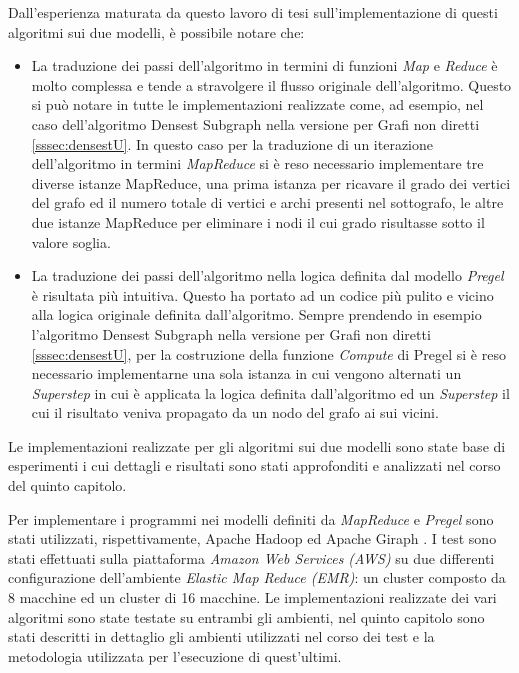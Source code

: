 \documentclass[LaM,binding=0.6cm]{sapthesis}
\begin{document}
Dall'esperienza maturata da questo lavoro di tesi sull'implementazione di questi algoritmi sui due modelli, è possibile notare che:
\begin{itemize}
\item La traduzione dei passi dell'algoritmo in termini di funzioni \textit{Map}  e \textit{Reduce} è molto complessa e tende a stravolgere il flusso originale dell'algoritmo. Questo si può notare in tutte le implementazioni realizzate come, ad esempio, nel caso dell'algoritmo Densest Subgraph nella versione per Grafi non diretti \ref{sssec:densestU}. In questo caso per la traduzione di un iterazione dell'algoritmo in termini \textit{MapReduce} si è reso necessario implementare tre diverse istanze MapReduce, una prima istanza per ricavare il grado dei vertici del grafo ed il numero totale di vertici e archi presenti nel sottografo, le altre due istanze MapReduce per eliminare i nodi il cui grado risultasse sotto il valore soglia. 
\item La traduzione dei passi dell'algoritmo nella logica definita dal modello \textit{Pregel} è risultata più intuitiva. Questo ha portato ad un codice più pulito e vicino alla logica originale definita dall'algoritmo. Sempre prendendo in esempio l'algoritmo Densest Subgraph nella versione per Grafi non diretti \ref{sssec:densestU}, per la costruzione della funzione \textit{Compute} di Pregel si è reso necessario implementarne una sola istanza in cui vengono alternati un \textit{Superstep} in cui è applicata la logica definita dall'algoritmo ed un \textit{Superstep} il cui il risultato veniva propagato da un nodo del grafo ai sui vicini.
\end{itemize}

Le implementazioni realizzate per gli algoritmi sui due modelli sono state base di esperimenti i cui dettagli e risultati sono stati approfonditi  e analizzati nel corso del quinto capitolo.

Per implementare i programmi nei modelli definiti da \textit{MapReduce} e \textit{Pregel} sono stati utilizzati, rispettivamente, Apache Hadoop \cite{1_hadoop.apache.org_2015} ed Apache Giraph \cite{4_giraph.apache.org_2015}.
I test sono stati effettuati sulla piattaforma \textit{Amazon Web Services (AWS)} \cite{1_amazon web services} su due differenti configurazione dell'ambiente \textit{Elastic Map Reduce (EMR)}: un cluster composto da 8 macchine ed un cluster di 16 macchine.
Le implementazioni realizzate dei vari algoritmi sono state testate su entrambi gli ambienti, nel quinto capitolo sono stati descritti in dettaglio gli ambienti utilizzati nel corso dei test e la metodologia utilizzata per l'esecuzione di quest'ultimi.
\end{document}
